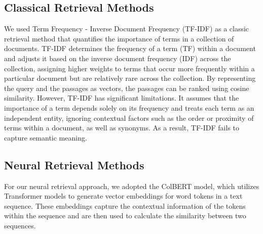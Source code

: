 \documentclass[11pt]{article}
\begin{document}
\subsection{Classical Retrieval Methods}
We used Term Frequency - Inverse Document Frequency (TF-IDF) as a classic retrieval method that quantifies the importance of terms in a collection of documents. TF-IDF determines the frequency of a term (TF) within a document and adjusts it based on the inverse document frequency (IDF) across the collection, assigning higher weights to terms that occur more frequently within a particular document but are relatively rare across the collection. By representing the query and the passages as vectors, the passages can be ranked using cosine similarity. However, TF-IDF has significant limitations. It assumes that the importance of a term depends solely on its frequency and treats each term as an independent entity, ignoring contextual factors such as the order or proximity of terms within a document, as well as synonyms. As a result, TF-IDF fails to capture semantic meaning.

\subsection{Neural Retrieval Methods}
For our neural retrieval approach, we adopted the ColBERT \cite{khattab2020ColBERT} model, which utilizes Transformer models to generate vector embeddings for word tokens in a text sequence. These embeddings capture the contextual information of the tokens within the sequence and are then used to calculate the similarity between two sequences.
\end{document}
